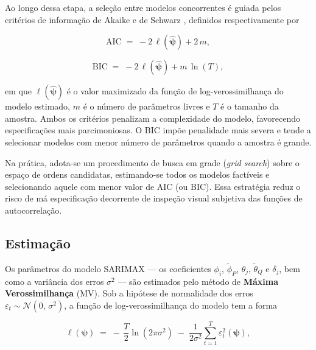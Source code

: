 Ao longo dessa etapa, a seleção entre modelos concorrentes é guiada pelos
critérios de informação de Akaike \citep[AIC;][]{akaike1974} e de Schwarz
\citep[BIC;][]{schwarz1978}, definidos respectivamente por
 
\begin{equation}
  \mathrm{AIC} \;=\; -2\,\ell(\hat{\boldsymbol{\psi}}) + 2\,m,
  \label{eq:aic}
\end{equation}
 
\begin{equation}
  \mathrm{BIC} \;=\; -2\,\ell(\hat{\boldsymbol{\psi}}) + m\,\ln(T),
  \label{eq:bic}
\end{equation}
 
\noindent
em que \(\ell(\hat{\boldsymbol{\psi}})\) é o valor maximizado da função de
log-verossimilhança do modelo estimado, \(m\) é o número de parâmetros
livres e \(T\) é o tamanho da amostra. Ambos os critérios penalizam a
complexidade do modelo, favorecendo especificações mais parcimoniosas. O BIC
impõe penalidade mais severa e tende a selecionar modelos com menor número
de parâmetros quando a amostra é grande.
 
Na prática, adota-se um procedimento de busca em grade (\textit{grid
search}) sobre o espaço de ordens candidatas, estimando-se todos os modelos
factíveis e selecionando aquele com menor valor de AIC (ou BIC). Essa
estratégia reduz o risco de má especificação decorrente de inspeção visual
subjetiva das funções de autocorrelação.
 
\subsection{Estimação}
\label{sec:sarimax_est}
 
Os parâmetros do modelo SARIMAX — os coeficientes \(\phi_i\), \(\tilde\phi_P\),
\(\theta_j\), \(\tilde\theta_Q\) e \(\delta_j\), bem como a variância dos
erros \(\sigma^2\) — são estimados pelo método de \textbf{Máxima
Verossimilhança} (MV). Sob a hipótese de normalidade dos erros
\(\varepsilon_t \sim \mathcal{N}(0,\,\sigma^2)\), a função de
log-verossimilhança do modelo tem a forma
 
\begin{equation}
  \ell(\boldsymbol{\psi}) \;=\;
    -\,\frac{T}{2}\ln(2\pi\sigma^2)
    \;-\; \frac{1}{2\sigma^2}\sum_{t=1}^{T}\varepsilon_t^2(\boldsymbol{\psi}),
  \label{eq:loglik}
\end{equation}
 
